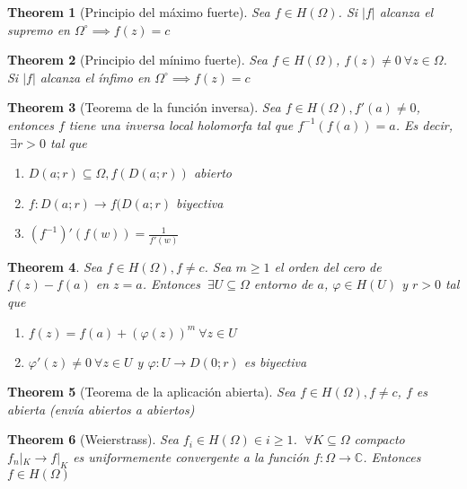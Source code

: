 \documentclass{myclass} \usepackage{verbatim}
\newtheorem*{theorem}{Theorem}
\begin{document}
\begin{theorem}[Principio del máximo fuerte]
Sea $f\in H(\Omega)$. Si $|f|$ alcanza el supremo en $\Omega^{\circ} \implies f(z) = c$
\end{theorem}

\begin{theorem}[Principio del mínimo fuerte]
Sea $f\in H(\Omega)$, $f(z)\neq 0 \ \forall z\in \Omega$. Si $|f|$ alcanza el ínfimo en  $\Omega^\circ \implies f(z) = c$
\end{theorem}

\begin{theorem}[Teorema de la función inversa] Sea $f\in H(\Omega), f'(a)\neq 0$, entonces $f$ tiene una inversa local holomorfa tal que  $f^{-1}(f(a))=a$. Es decir, $\ \exists r>0$ tal que
  \begin{enumerate}[topsep=-6pt, itemsep=0pt]
    \item $D(a;r) \subseteq  \Omega, f(D(a;r))$ abierto
	\item $f: D(a;r) \to f(D(a;r)$ biyectiva
	\item $(f^{-1})'(f(w))=\frac{1}{f'(w)}$
  \end{enumerate}
\end{theorem}

\begin{theorem} Sea $f\in H(\Omega), f\neq c$. Sea $m\ge 1$ el orden del cero de $f(z)-f(a)$ en  $z = a$. Entonces  $\ \exists U\subseteq \Omega$ entorno de $a$, $\varphi \in H(U)$ y $r>0$ tal que
   \begin{enumerate}[topsep=-6pt, itemsep=0pt]
    \item $f(z) = f(a) + (\varphi (z))^m \ \forall z\in U$
	\item $\varphi '(z) \neq 0 \ \forall z\in U$ y $\varphi : U \to D(0;r)$ es biyectiva
  \end{enumerate}
\end{theorem}

\begin{theorem}[Teorema de la aplicación abierta]
Sea $f\in H(\Omega), f\neq c$,  $f$ es abierta (envía abiertos a abiertos)
\end{theorem}

\begin{theorem}[Weierstrass]
Sea $f_i \in H(\Omega) \in i\ge 1$. $\ \forall K\subseteq \Omega$ compacto $f_n|_K \to f|_K$ es uniformemente convergente a la función $f:\Omega \to \mathbb{C}$. Entonces $f\in H(\Omega)$
\end{theorem}
\end{document}

